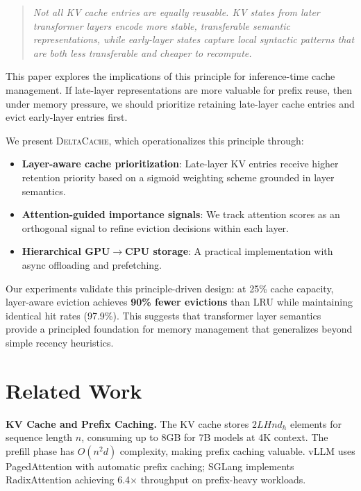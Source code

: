 \documentclass{article}
\newcommand{\deltacache}{\textsc{DeltaCache}}
\begin{document}
\begin{quote}
\emph{Not all KV cache entries are equally reusable.
KV states from later transformer layers encode more stable, transferable semantic representations, while early-layer states capture local syntactic patterns that are both less transferable and cheaper to recompute.}
\end{quote}

This paper explores the implications of this principle for inference-time cache management.
If late-layer representations are more valuable for prefix reuse, then under memory pressure, we should prioritize retaining late-layer cache entries and evict early-layer entries first.

We present \deltacache{}, which operationalizes this principle through:
\begin{itemize}
    \item \textbf{Layer-aware cache prioritization}: Late-layer KV entries receive higher retention priority based on a sigmoid weighting scheme grounded in layer semantics.
    \item \textbf{Attention-guided importance signals}: We track attention scores as an orthogonal signal to refine eviction decisions within each layer.
    \item \textbf{Hierarchical GPU$\rightarrow$CPU storage}: A practical implementation with async offloading and prefetching.
\end{itemize}

Our experiments validate this principle-driven design: at 25\% cache capacity, layer-aware eviction achieves \textbf{90\% fewer evictions} than LRU while maintaining identical hit rates (97.9\%).
This suggests that transformer layer semantics provide a principled foundation for memory management that generalizes beyond simple recency heuristics.

\section{Related Work}

\textbf{KV Cache and Prefix Caching.}
The KV cache stores $2LHnd_h$ elements for sequence length $n$, consuming up to 8GB for 7B models at 4K context.
The prefill phase has $O(n^2d)$ complexity, making prefix caching valuable.
vLLM \citep{kwon2023efficient} uses PagedAttention with automatic prefix caching; SGLang \citep{zheng2023sglang} implements RadixAttention achieving 6.4$\times$ throughput on prefix-heavy workloads.
\end{document}
